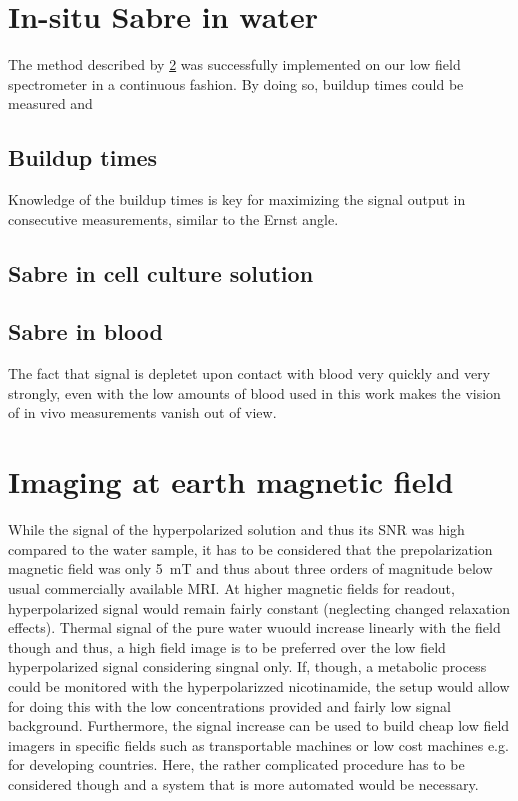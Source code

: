     \section{In-situ Sabre in water}
    The method described by \ref{} was successfully implemented on our low field spectrometer in a continuous fashion. By doing so, buildup times could be measured and
    \subsection{Buildup times}
        Knowledge of the buildup times is key for maximizing the signal output in consecutive measurements, similar to the Ernst angle.
    \subsection{Sabre in cell culture solution}
    \subsection{Sabre in blood}
        The fact that signal is depletet upon contact with blood very quickly and very strongly, even with the low amounts of blood used in this work makes the vision of in vivo measurements vanish out of view. 
    \section{Imaging at earth magnetic field}
        While the signal of the hyperpolarized solution and thus its SNR was high compared to the water sample, it has to be considered that the prepolarization magnetic field was only \SI{5}{\milli\tesla} and thus about three orders of magnitude below usual commercially available MRI. At higher magnetic fields for readout, hyperpolarized signal would remain fairly constant (neglecting changed relaxation effects). Thermal signal of the pure water wuould increase linearly with the field though and thus, a high field image is to be preferred over the low field hyperpolarized signal considering singnal only. If, though, a metabolic process could be monitored with the hyperpolarizzed nicotinamide, the setup would allow for doing this with the low concentrations provided and fairly low signal background. Furthermore, the signal increase can be used to build cheap low field imagers in specific fields such as transportable machines or low cost machines e.g. for developing countries. Here, the rather complicated procedure has to be considered though and a system that is more automated would be necessary.
